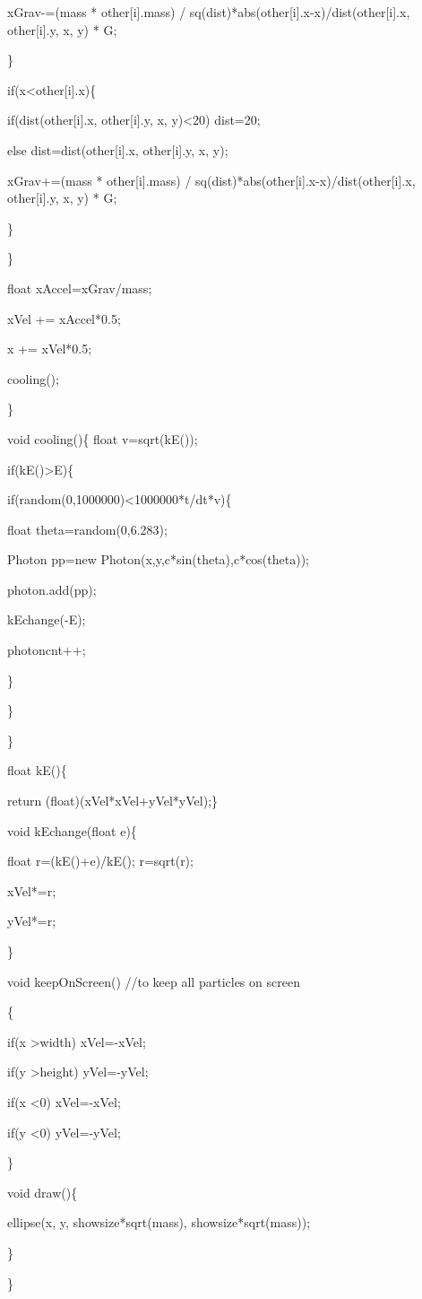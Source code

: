 \documentclass{gshs-hutech}
\begin{document}
\begin{tiny}
xGrav-=(mass * other[i].mass) / sq(dist)*abs(other[i].x-x)/dist(other[i].x, other[i].y, x, y) * G;

\}

if(x\textless other[i].x)\{

if(dist(other[i].x, other[i].y, x, y)\textless20) dist=20;

else dist=dist(other[i].x, other[i].y, x, y);

xGrav+=(mass * other[i].mass) / sq(dist)*abs(other[i].x-x)/dist(other[i].x, other[i].y, x, y) * G;

\}

\}

float xAccel=xGrav/mass;

xVel += xAccel*0.5;

x += xVel*0.5;


cooling();

\}



void cooling()\{
float v=sqrt(kE());

if(kE()\textgreater E)\{

if(random(0,1000000)\textless1000000*t/dt*v)\{

float theta=random(0,6.283);

Photon pp=new Photon(x,y,c*sin(theta),c*cos(theta));

photon.add(pp);

kEchange(-E);

photoncnt++;

\}

\}

\}



float kE()\{

return (float)(xVel*xVel+yVel*yVel);\}

void kEchange(float e)\{

float r=(kE()+e)/kE();
r=sqrt(r);

xVel*=r;

yVel*=r;

\}

void
keepOnScreen()                                                                                             //to keep all particles on screen

\{

if(x  \textgreater width) xVel=-xVel;

if(y  \textgreater height) yVel=-yVel;

if(x  \textless 0) xVel=-xVel;

if(y  \textless 0) yVel=-yVel;

\}

void draw()\{

ellipse(x, y, showsize*sqrt(mass), showsize*sqrt(mass));

\}

\}



\end{tiny}
\end{document}

